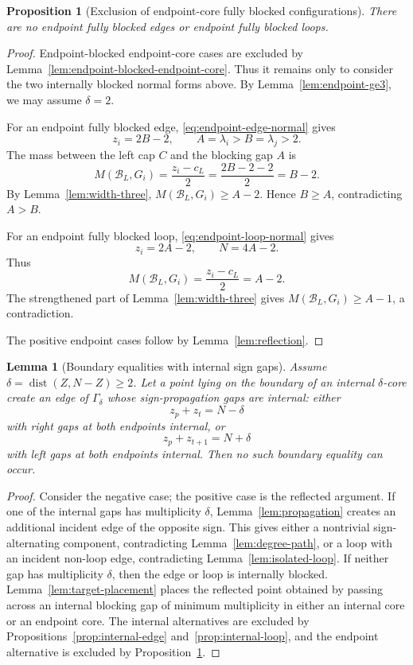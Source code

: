 \documentclass[11pt]{article}
\newtheorem{lemma}[theorem]{Lemma}
\newtheorem{proposition}[theorem]{Proposition}
\newcommand{\dist}{\operatorname{dist}}
\begin{document}
\begin{proposition}[Exclusion of endpoint-core fully blocked configurations]\label{prop:endpoint-exclusion}
There are no endpoint fully blocked edges or endpoint fully blocked loops.
\end{proposition}

\begin{proof}
Endpoint-blocked endpoint-core cases are excluded by Lemma~\ref{lem:endpoint-blocked-endpoint-core}.  Thus it remains only to consider the two internally blocked normal forms above.  By Lemma~\ref{lem:endpoint-ge3}, we may assume \(\delta=2\).

For an endpoint fully blocked edge, \eqref{eq:endpoint-edge-normal} gives
\[
        z_i=2B-2,
        \qquad
        A=\lambda_i>B=\lambda_j>2.
\]
The mass between the left cap \(C\) and the blocking gap \(A\) is
\[
        M(\mathcal B_L,G_i)=\frac{z_i-c_L}{2}=\frac{2B-2-2}{2}=B-2.
\]
By Lemma~\ref{lem:width-three}, \(M(\mathcal B_L,G_i)\ge A-2\).  Hence \(B\ge A\), contradicting \(A>B\).

For an endpoint fully blocked loop, \eqref{eq:endpoint-loop-normal} gives
\[
        z_i=2A-2,
        \qquad
        N=4A-2.
\]
Thus
\[
        M(\mathcal B_L,G_i)=\frac{z_i-c_L}{2}=A-2.
\]
The strengthened part of Lemma~\ref{lem:width-three} gives \(M(\mathcal B_L,G_i)\ge A-1\), a contradiction.

The positive endpoint cases follow by Lemma~\ref{lem:reflection}.
\end{proof}



\begin{lemma}[Boundary equalities with internal sign gaps]\label{lem:boundary-created-internal-edge}
Assume \(\delta=\dist(Z,N-Z)\ge2\).  Let a point lying on the boundary of an internal \(\delta\)-core create an edge of \(\Gamma_\delta\) whose sign-propagation gaps are internal: either
\[
        z_p+z_t=N-\delta
\]
with right gaps at both endpoints internal, or
\[
        z_p+z_{t+1}=N+\delta
\]
with left gaps at both endpoints internal.  Then no such boundary equality can occur.
\end{lemma}

\begin{proof}
Consider the negative case; the positive case is the reflected argument.  If one of the internal gaps has multiplicity \(\delta\), Lemma~\ref{lem:propagation} creates an additional incident edge of the opposite sign.  This gives either a nontrivial sign-alternating component, contradicting Lemma~\ref{lem:degree-path}, or a loop with an incident non-loop edge, contradicting Lemma~\ref{lem:isolated-loop}.  If neither gap has multiplicity \(\delta\), then the edge or loop is internally blocked.  Lemma~\ref{lem:target-placement} places the reflected point obtained by passing across an internal blocking gap of minimum multiplicity in either an internal core or an endpoint core.  The internal alternatives are excluded by Propositions~\ref{prop:internal-edge} and~\ref{prop:internal-loop}, and the endpoint alternative is excluded by Proposition~\ref{prop:endpoint-exclusion}.
\end{proof}
\end{document}
